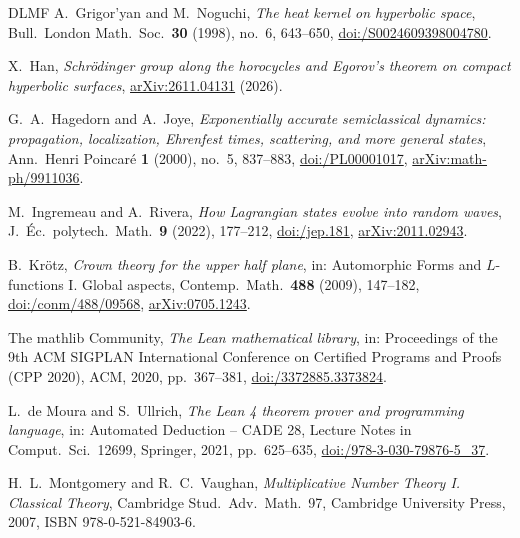 \documentclass[twoside,10pt]{article}
\numberwithin{equation}{section}
\theoremstyle{slbody}
\theoremstyle{remark}
\begin{document}
\begin{thebibliography}{DLMF}
A.~Grigor'yan and M.~Noguchi,
\emph{The heat kernel on hyperbolic space},
Bull.\ London Math.\ Soc.\ \textbf{30} (1998), no.~6, 643--650,
\href{https://doi.org/10.1112/S0024609398004780}{doi:/S0024609398004780}.

X.~Han,
\emph{Schr\"odinger group along the horocycles and Egorov's theorem on compact hyperbolic surfaces},
\href{https://arxiv.org/abs/2611.04131}{arXiv:2611.04131} (2026).

G.~A.~Hagedorn and A.~Joye,
\emph{Exponentially accurate semiclassical dynamics: propagation, localization,
Ehrenfest times, scattering, and more general states},
Ann.\ Henri Poincar\'e \textbf{1} (2000), no.~5, 837--883,
\href{https://doi.org/10.1007/PL00001017}{doi:/PL00001017},
\href{https://arxiv.org/abs/math-ph/9911036}{arXiv:math-ph/9911036}.

M.~Ingremeau and A.~Rivera,
\emph{How Lagrangian states evolve into random waves},
J.\ \'Ec.\ polytech.\ Math.\ \textbf{9} (2022), 177--212,
\href{https://doi.org/10.5802/jep.181}{doi:/jep.181},
\href{https://arxiv.org/abs/2011.02943}{arXiv:2011.02943}.

B.~Kr\"otz,
\emph{Crown theory for the upper half plane},
in: Automorphic Forms and $L$-functions I. Global aspects,
Contemp.\ Math.\ \textbf{488} (2009), 147--182,
\href{https://doi.org/10.1090/conm/488/09568}{doi:/conm/488/09568},
\href{https://arxiv.org/abs/0705.1243}{arXiv:0705.1243}.

The mathlib Community,
\emph{The Lean mathematical library},
in: Proceedings of the 9th ACM SIGPLAN International Conference on Certified Programs and Proofs (CPP 2020),
ACM, 2020, pp.~367--381,
\href{https://doi.org/10.1145/3372885.3373824}{doi:/3372885.3373824}.

L.~de Moura and S.~Ullrich,
\emph{The Lean 4 theorem prover and programming language},
in: Automated Deduction -- CADE 28, Lecture Notes in Comput.\ Sci.\ 12699, Springer, 2021, pp.~625--635,
\href{https://doi.org/10.1007/978-3-030-79876-5_37}{doi:/978-3-030-79876-5\_37}.

H.~L.~Montgomery and R.~C.~Vaughan,
\emph{Multiplicative Number Theory I. Classical Theory},
Cambridge Stud.\ Adv.\ Math.\ 97, Cambridge University Press, 2007,
ISBN 978-0-521-84903-6.


\end{thebibliography}
\end{document}
